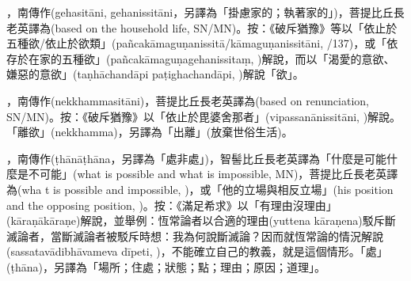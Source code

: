 \startitemgroup[noteitems]
\item{}，南傳作(gehasitāni, gehanissitāni，另譯為「掛慮家的；執著家的」)，菩提比丘長老英譯為(based on the household life, SN/MN)。按：《破斥猶豫》等以「依止於五種欲/依止於欲類」(pañcakāmaguṇanissitā/kāmaguṇanissitāni, /137)，或「依存於在家的五種欲」(pañcakāmaguṇagehanissitaṃ, )解說，而以「渴愛的意欲、嫌惡的意欲」(taṇhāchandāpi paṭighachandāpi, )解說「欲」。
\item{}，南傳作(nekkhammasitāni)，菩提比丘長老英譯為(based on renunciation, SN/MN)。按：《破斥猶豫》以「依止於毘婆舍那者」(vipassanānissitāni, )解說。「離欲」(nekkhamma)，另譯為「出離」(放棄世俗生活)。
\stopitemgroup

\startitemgroup[noteitems]
\item{}，南傳作(ṭhānāṭhāna，另譯為「處非處」)，智髻比丘長老英譯為「什麼是可能什麼是不可能」(what is possible and what is impossible, MN)，菩提比丘長老英譯為(wha t is possible and impossible, )，或「他的立場與相反立場」(his position and the opposing position, )。按：《滿足希求》以「有理由沒理由」(kāraṇākāraṇe)解說，並舉例：恆常論者以合適的理由(yuttena kāraṇena)駁斥斷滅論者，當斷滅論者被駁斥時想：我為何說斷滅論？因而就恆常論的情況解說(sassatavādibhāvameva dīpeti, )，不能確立自己的教義，就是這個情形。「處」(ṭhāna)，另譯為「場所；住處；狀態；點；理由；原因；道理」。
\stopitemgroup

